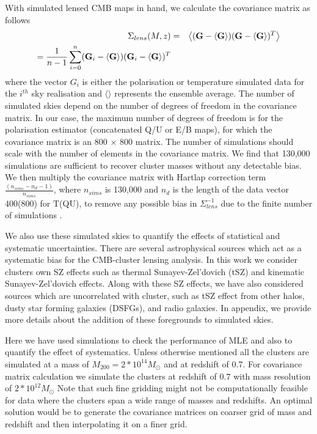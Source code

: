  
 With simulated lensed CMB maps in hand, we calculate the covariance matrix as follows
 \begin{eqnarray}
\Sigma_{lens}(M,z) & = & \left<(\textrm{\textbf{G}} - \left<\textrm{\textbf{G}}\right>) (\textrm{\textbf{G}} - \left<\textrm{\textbf{G}}\right>)^{T}\right>\\
  =   \frac{1}{n-1}\sum\limits_{i = 0}^{n} (\textrm{\textbf{G}}_{i} - \left<\textrm{\textbf{G}}\right>) (\textrm{\textbf{G}}_{i} - \left<\textrm{\textbf{G}}\right>)^{T} %
\label{eq_lensed_cmb_cov_mass_z}
\end{eqnarray}
 where the vector $G_{i}$ is either the polarisation or temperature simulated data for the $i^{th}$ sky realisation and $\langle \rangle$ represents the ensemble average. 
 The number of simulated skies depend on the number of degrees of freedom in the covariance matrix. 
 In our case, the maximum number of degrees of freedom is for the polarisation estimator (concatenated Q/U or E/B maps), for which the covariance matrix is an 800 $\times$ 800 matrix. %
 The number of simulations should scale with the number of elements in the covariance matrix. 
  We find that 130,000 simulations are sufficient to recover cluster masses without any detectable bias. 
  We then multiply the covariance matrix with Hartlap correction term $\frac{(n_{sims} -n_{d} -1)}{n_{sims}}$, where $n_{sims}$ is 130,000 and $n_{d}$ is the length of the data vector 400(800) for T(QU), to remove any possible bias in $\Sigma^{-1}_{lens}$ due to the finite number of simulations \citep{hartlap06}. 
  
 We also use these simulated skies to quantify the effects of statistical and systematic uncertainties.
 There are several astrophysical sources which act as a systematic bias for the CMB-cluster lensing analysis. 
 In this work we consider clusters own SZ effects such as thermal Sunayev-Zel'dovich (tSZ) and kinematic Sunayev-Zel'dovich effects. 
 Along with these SZ effects, we have also considered sources which are uncorrelated with cluster, such as tSZ effect from other halos, dusty star forming galaxies (DSFGs), and radio galaxies.
 In appendix, we provide more details about the addition of these foregrounds to simulated skies.
 
Here we have used simulations to check the performance of MLE and also to quantify the effect of systematics. 
 Unless otherwise mentioned all the clusters are simulated at a mass of $M_{200} = 2*10^{14} M_{\odot}$ %
 and at redshift of 0.7.
 For covariance matrix calculation we simulate the clusters at redshift of $0.7$ with mass resolution of $2*10^{12} M_{\odot}$
 Note that such fine gridding might not be computationally feasible for data where the clusters span a wide range of masses and redshifts.
 An optimal solution would be to generate the covariance matrices on coarser grid of mass and redshift and then interpolating it on a finer grid.  
 
